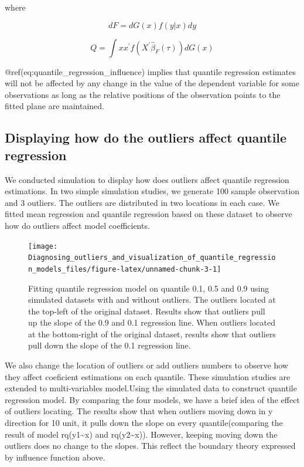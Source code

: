 \documentclass[11pt,a4paper,]{article}
\theoremstyle{definition}
\theoremstyle{definition}
\theoremstyle{remark}
\begin{document}
where

\begin{equation}
dF=dG(x)f(y|x)dy
\label{eq: dg}
\end{equation}

\begin{equation}
Q=\int xx^{'}f(X^{'}\hat{\beta}_{F}(\tau))dG(x)
\label{eq: q_influence}
\end{equation}

@ref(eq:quantile\_regression\_influence) implies that quantile
regression estimates will not be affected by any change in the value of
the dependent variable for some observations as long as the relative
positions of the observation points to the fitted plane are maintained.

\subsection{Displaying how do the outliers affect quantile
regression}\label{displaying-how-do-the-outliers-affect-quantile-regression}

We conducted simulation to display how does outliers affect quantile
regression estimations. In two simple simulation studies, we generate
100 sample observation and 3 outliers. The outliers are distributed in
two locations in each case. We fitted mean regression and quantile
regression based on these dataset to observe how do outliers affect
model coefficients.

\begin{figure}

{\centering \texttt{[image: Diagnosing\_outliers\_and\_visualization\_of\_quantile\_regression\_models\_files/figure-latex/unnamed-chunk-3-1]} 

}

\caption{Fitting quantile regression model on quantile 0.1, 0.5 and 0.9 using simulated datasets with and without outliers. The outliers located at the top-left of the original dataset. Results show that outliers pull up the slope of the 0.9 and 0.1 regression line. When outliers located at the bottom-right of the original dataset, results show that outliers pull down the slope of the 0.1 regression line.}\label{fig:unnamed-chunk-3}
\end{figure}

We also change the location of outliers or add outliers numbers to
observe how they affect coeficient estimations on each quantile. These
simulation studies are extended to multi-variables model.Using the
simulated data to construct quantile regression model. By comparing the
four models, we have a brief idea of the effect of outliers locating.
The results show that when outliers moving down in y direction for 10
unit, it pulls down the slope on every quantile(comparing the result of
model rq(y1\textasciitilde{}x) and rq(y2\textasciitilde{}x)). However,
keeping moving down the outliers does no change to the slopes. This
reflect the boundary theory expressed by influence function above.
\end{document}
